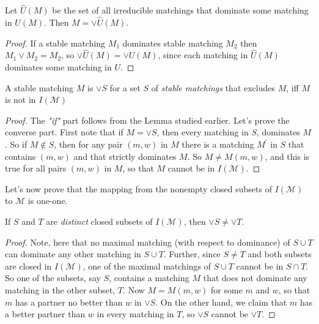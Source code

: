 \begin{corollary}\label{cor_2_1}
Let $\hat{U}(M)$ be the set of all irreducible matchings that dominate some matching in $U(M)$. Then $M = \vee \hat{U}(M)$.
\end{corollary}

\begin{proof}
If a stable matching $M_1$ dominates stable matching $M_2$ then $M_1 \vee M_2 = M_2$, so $\vee \hat{U}(M) = \vee U(M)$, since each matching in $\hat{U}(M)$ dominates some matching in $U$.
\end{proof}

\begin{corollary}\label{cor_2_2}
A stable matching $M$ is $\vee S$ for a set $S$ of \textit{stable matchings} that excludes $M$, iff $M$ is not in $I(\mathcal{M})$
\end{corollary}

\begin{proof}
    The \textit{"if"} part follows from the Lemma studied earlier. Let's prove the converse part. First note that if $M = \vee S$, then every matching in $S$, dominates $M$. So if $M \notin S$, then for any pair $(m, w)$ in $M$ there is a matching $M^\prime$ in $S$ that contains $(m, w)$ and that strictly dominates $M$. So $M \neq M(m, w)$, and this is true for all pairs $(m, w)$ in $M$, so that $M$ cannot be in $I(\mathcal{M})$.
\end{proof}

Let's now prove that the mapping from the nonempty closed subsets of
$I(\mathcal{M})$ to $\mathcal{M}$ is one-one.

\begin{lemma}\label{lem_2_2}
    If $S$ and $T$ are \textit{distinct} closed subsets of $I(\mathcal{M})$, then $\vee S \neq \vee T$.
\end{lemma}

\begin{proof}
     Note, here that no maximal matching (with respect to dominance) of $S \cup T$ can dominate any other matching in $S \cup T$. Further, since $S \neq T$ and both subsets are closed in $I(\mathcal{M})$, one of the maximal matchings of $S \cup T$ cannot be in $S \cap T$. So one of the subsets, say $S$, contains a matching $M$ that does not dominate any matching in the other subset, $T$. Now $M = M(m, w)$ for some $m$ and $w$, so that $m$ has a partner no better than $w$ in $\vee S$. On the other hand, we claim that $m$ has a better partner than $w$ in every matching in $T$, so $\vee S$ cannot be $\vee T$. 
\end{proof}

